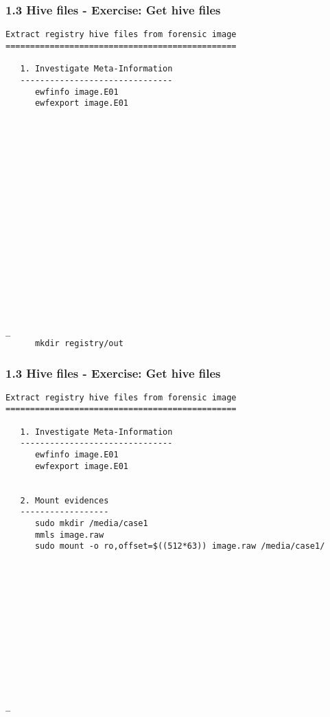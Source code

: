 \begin{frame}[fragile]
  \frametitle{1.3 Hive files - Exercise: Get hive files}
    \begin{lstlisting}[basicstyle=\tiny]
Extract registry hive files from forensic image
===============================================

   1. Investigate Meta-Information
   -------------------------------
      ewfinfo image.E01
      ewfexport image.E01



















_
      mkdir registry/out
    \end{lstlisting}
\end{frame}


\begin{frame}[fragile]
  \frametitle{1.3 Hive files - Exercise: Get hive files}
    \begin{lstlisting}[basicstyle=\tiny]
Extract registry hive files from forensic image
===============================================

   1. Investigate Meta-Information
   -------------------------------
      ewfinfo image.E01
      ewfexport image.E01


   2. Mount evidences
   ------------------
      sudo mkdir /media/case1
      mmls image.raw
      sudo mount -o ro,offset=$((512*63)) image.raw /media/case1/













_
    \end{lstlisting}
\end{frame}


